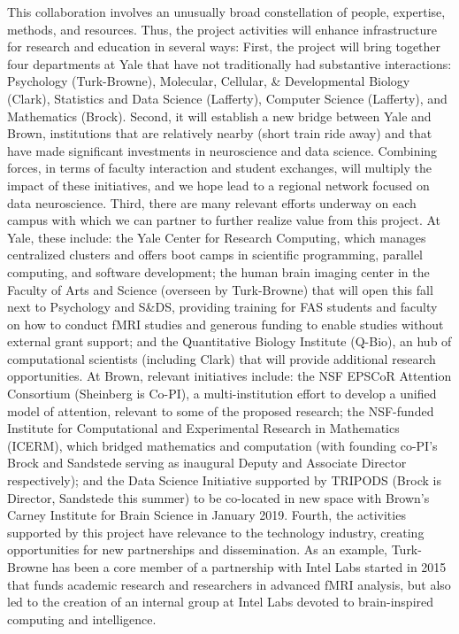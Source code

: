 This collaboration involves an unusually broad constellation of people,
expertise, methods, and resources. Thus, the project activities will
enhance infrastructure for research and education in several ways:
First, the project will bring together four departments at Yale that
have not traditionally had substantive interactions: Psychology
(Turk-Browne), Molecular, Cellular, \& Developmental Biology (Clark),
Statistics and Data Science (Lafferty), Computer Science (Lafferty), and Mathematics (Brock). 
Second, it will establish a
new bridge between Yale and Brown, institutions that are relatively
nearby (short train ride away) and that have made significant
investments in neuroscience and data science. Combining forces, in terms
of faculty interaction and student exchanges, will multiply the impact
of these initiatives, and we hope lead to a regional network focused on
data neuroscience. Third, there are many relevant efforts underway on
each campus with which we can partner to further realize value from this
project. At Yale, these include: the Yale Center for Research Computing,
which manages centralized clusters and offers boot camps in scientific
programming, parallel computing, and software development; the human
brain imaging center in the Faculty of Arts and Science (overseen by
Turk-Browne) that will open this fall next to Psychology and S\&DS,
providing training for FAS students and faculty on how to conduct fMRI
studies and generous funding to enable studies without external grant
support; and the Quantitative Biology Institute (Q-Bio), an hub of
computational scientists (including Clark) that will provide additional
research opportunities. At Brown, relevant initiatives include: the NSF
EPSCoR Attention Consortium (Sheinberg is Co-PI), a multi-institution
effort to develop a unified model of attention, relevant to some of the
proposed research; the NSF-funded Institute for Computational and
Experimental Research in Mathematics (ICERM), which bridged mathematics
and computation (with founding co-PI's Brock and Sandstede serving as inaugural Deputy and Associate Director respectively);
and the Data Science Initiative supported by TRIPODS (Brock is
Director, Sandstede this summer) to be co-located in new space with Brown's Carney Institute for Brain Science in January 2019. Fourth, the activities supported by
this project have relevance to the technology industry, creating
opportunities for new partnerships and dissemination. As an example,
Turk-Browne has been a core member of a partnership with Intel Labs
started in 2015 that funds academic research and researchers in advanced
fMRI analysis, but also led to the creation of an internal group at
Intel Labs devoted to brain-inspired computing and intelligence.

